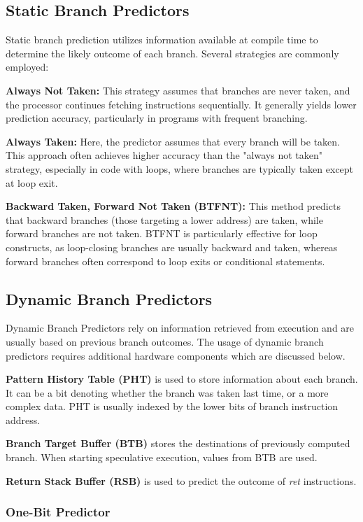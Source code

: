 \subsection{Static Branch Predictors}

Static branch prediction utilizes information available at compile time to determine the likely outcome of each branch. Several strategies are commonly employed:

\textbf{Always Not Taken:} This strategy assumes that branches are never taken, and the processor continues fetching instructions sequentially. It generally yields lower prediction accuracy, particularly in programs with frequent branching.

\textbf{Always Taken:} Here, the predictor assumes that every branch will be taken. This approach often achieves higher accuracy than the "always not taken" strategy, especially in code with loops, where branches are typically taken except at loop exit.

\textbf{Backward Taken, Forward Not Taken (BTFNT):} This method predicts that backward branches (those targeting a lower address) are taken, while forward branches are not taken. BTFNT is particularly effective for loop constructs, as loop-closing branches are usually backward and taken, whereas forward branches often correspond to loop exits or conditional statements.

\subsection{Dynamic Branch Predictors}

Dynamic Branch Predictors rely on information retrieved from execution and are usually based on previous branch outcomes. The usage of dynamic branch predictors requires additional hardware components which are discussed below.

\textbf{Pattern History Table (PHT)} is used to store information about each branch. It can be a bit denoting whether the branch was taken last time, or a more complex data. PHT is usually indexed by the lower bits of branch instruction address.

\textbf{Branch Target Buffer (BTB)} stores the destinations of previously computed branch. When starting speculative execution, values from BTB are used.

\textbf{Return Stack Buffer (RSB)} is used to predict the outcome of \textit{ret} instructions.

\subsubsection{One-Bit Predictor}

